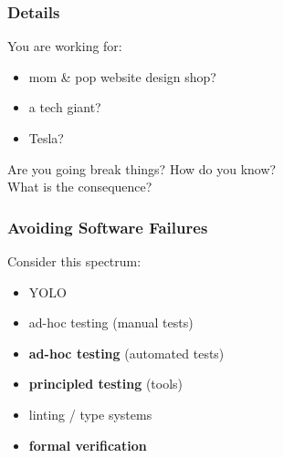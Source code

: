 \documentclass{beamer}
\newenvironment{changemargin}[1]{%
  \begin{list}{}{%
    \setlength{\topsep}{0pt}%
    \setlength{\leftmargin}{#1}%
    \setlength{\rightmargin}{1em}
    \setlength{\listparindent}{\parindent}%
    \setlength{\itemindent}{\parindent}%
    \setlength{\parsep}{\parskip}%
  }%
  \item[]}{\end{list}}
\begin{document}
\begin{frame}
  \frametitle{Details}
  \begin{changemargin}{2em}
    \Large
  You are working for:
  \begin{itemize}
  \item mom \& pop website design shop?
  \item a tech giant?
  \item Tesla?
  \end{itemize}
  \vspace*{1em}
\begin{center}
  Are you going break things? How do you know?\\
  What is the consequence?
\end{center}
    
  \end{changemargin}
\end{frame}

\usebackgroundtemplate{}

\begin{frame}
  \frametitle{Avoiding Software Failures}

  \Large
  \begin{changemargin}{2em}
    Consider this spectrum:\\[1em]
      \begin{itemize}
      \item YOLO
      \item ad-hoc testing (manual tests)
      \item {\bf ad-hoc testing} (automated tests)
      \item {\bf principled testing} (tools)
      \item linting / type systems
      \item {\bf formal verification}
      \end{itemize}
    \end{changemargin}

\end{frame}
\end{document}
